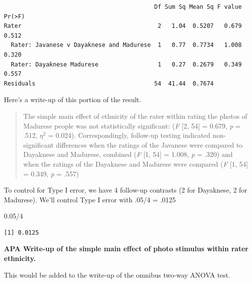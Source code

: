\documentclass[
  11pt,
]{book}
\newenvironment{Shaded}{\begin{snugshade}}{\end{snugshade}}
\newcommand{\DecValTok}[1]{\textcolor[rgb]{0.00,0.00,0.81}{#1}}
\newcommand{\FloatTok}[1]{\textcolor[rgb]{0.00,0.00,0.81}{#1}}
\newcommand{\SpecialCharTok}[1]{\textcolor[rgb]{0.00,0.00,0.00}{#1}}
\begin{document}
\begin{verbatim}
                                           Df Sum Sq Mean Sq F value Pr(>F)
Rater                                       2   1.04  0.5207   0.679  0.512
  Rater: Javanese v Dayaknese and Madurese  1   0.77  0.7734   1.008  0.320
  Rater: Dayaknese Madurese                 1   0.27  0.2679   0.349  0.557
Residuals                                  54  41.44  0.7674               
\end{verbatim}

Here's a write-up of this portion of the result.

\begin{quote}
The simple main effect of ethnicity of the rater within rating the photos of Madurese people was not statistically significant: (\emph{F} {[}2, 54{]} = 0.679, \emph{p} = .512, \(\eta ^{2}\) = 0.024). Correspondingly, follow-up testing indicated non-significant differences when the ratings of the Javanese were compared to Dayaknese and Madurese, combined (\emph{F} {[}1, 54{]} = 1.008, \emph{p} = .320) and when the ratings of the Dayaknese and Madurese were compared (\emph{F} {[}1, 54{]} = 0.349, \emph{p} = .557)
\end{quote}

To control for Type I error, we have 4 follow-up contrasts (2 for Dayaknese, 2 for Madurese). We'll control Type I error with .05/4 = .0125

\begin{Shaded}
\begin{Highlighting}[]
\FloatTok{0.05}\SpecialCharTok{/}\DecValTok{4}
\end{Highlighting}
\end{Shaded}

\begin{verbatim}
[1] 0.0125
\end{verbatim}

\textbf{APA Write-up of the simple main effect of photo stimulus within rater ethnicity.}

This would be added to the write-up of the omnibus two-way ANOVA test.
\end{document}
